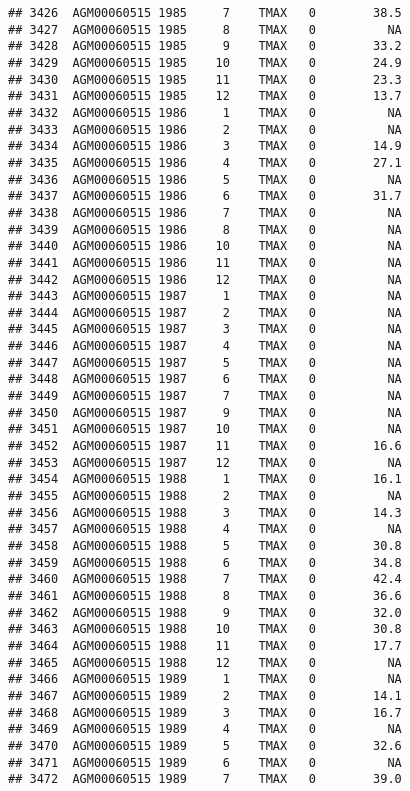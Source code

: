 \documentclass{article}\usepackage[]{graphicx}\usepackage[]{color}
\makeatletter
\newenvironment{kframe}{%
 \def\at@end@of@kframe{}%
 \ifinner\ifhmode%
  \def\at@end@of@kframe{\end{minipage}}%
  \begin{minipage}{\columnwidth}%
 \fi\fi%
 \def\FrameCommand##1{\hskip\@totalleftmargin \hskip-\fboxsep
 \colorbox{shadecolor}{##1}\hskip-\fboxsep
     \hskip-\linewidth \hskip-\@totalleftmargin \hskip\columnwidth}%
 \MakeFramed {\advance\hsize-\width
   \@totalleftmargin\z@ \linewidth\hsize
   \@setminipage}}%
 {\par\unskip\endMakeFramed%
 \at@end@of@kframe}
\newenvironment{knitrout}{}{} %
\makeatother
\begin{document}
\begin{knitrout}
\begin{kframe}
\begin{verbatim}
## 3426  AGM00060515 1985     7    TMAX   0        38.5
## 3427  AGM00060515 1985     8    TMAX   0          NA
## 3428  AGM00060515 1985     9    TMAX   0        33.2
## 3429  AGM00060515 1985    10    TMAX   0        24.9
## 3430  AGM00060515 1985    11    TMAX   0        23.3
## 3431  AGM00060515 1985    12    TMAX   0        13.7
## 3432  AGM00060515 1986     1    TMAX   0          NA
## 3433  AGM00060515 1986     2    TMAX   0          NA
## 3434  AGM00060515 1986     3    TMAX   0        14.9
## 3435  AGM00060515 1986     4    TMAX   0        27.1
## 3436  AGM00060515 1986     5    TMAX   0          NA
## 3437  AGM00060515 1986     6    TMAX   0        31.7
## 3438  AGM00060515 1986     7    TMAX   0          NA
## 3439  AGM00060515 1986     8    TMAX   0          NA
## 3440  AGM00060515 1986    10    TMAX   0          NA
## 3441  AGM00060515 1986    11    TMAX   0          NA
## 3442  AGM00060515 1986    12    TMAX   0          NA
## 3443  AGM00060515 1987     1    TMAX   0          NA
## 3444  AGM00060515 1987     2    TMAX   0          NA
## 3445  AGM00060515 1987     3    TMAX   0          NA
## 3446  AGM00060515 1987     4    TMAX   0          NA
## 3447  AGM00060515 1987     5    TMAX   0          NA
## 3448  AGM00060515 1987     6    TMAX   0          NA
## 3449  AGM00060515 1987     7    TMAX   0          NA
## 3450  AGM00060515 1987     9    TMAX   0          NA
## 3451  AGM00060515 1987    10    TMAX   0          NA
## 3452  AGM00060515 1987    11    TMAX   0        16.6
## 3453  AGM00060515 1987    12    TMAX   0          NA
## 3454  AGM00060515 1988     1    TMAX   0        16.1
## 3455  AGM00060515 1988     2    TMAX   0          NA
## 3456  AGM00060515 1988     3    TMAX   0        14.3
## 3457  AGM00060515 1988     4    TMAX   0          NA
## 3458  AGM00060515 1988     5    TMAX   0        30.8
## 3459  AGM00060515 1988     6    TMAX   0        34.8
## 3460  AGM00060515 1988     7    TMAX   0        42.4
## 3461  AGM00060515 1988     8    TMAX   0        36.6
## 3462  AGM00060515 1988     9    TMAX   0        32.0
## 3463  AGM00060515 1988    10    TMAX   0        30.8
## 3464  AGM00060515 1988    11    TMAX   0        17.7
## 3465  AGM00060515 1988    12    TMAX   0          NA
## 3466  AGM00060515 1989     1    TMAX   0          NA
## 3467  AGM00060515 1989     2    TMAX   0        14.1
## 3468  AGM00060515 1989     3    TMAX   0        16.7
## 3469  AGM00060515 1989     4    TMAX   0          NA
## 3470  AGM00060515 1989     5    TMAX   0        32.6
## 3471  AGM00060515 1989     6    TMAX   0          NA
## 3472  AGM00060515 1989     7    TMAX   0        39.0

\end{verbatim}
\end{kframe}
\end{knitrout}
\end{document}
